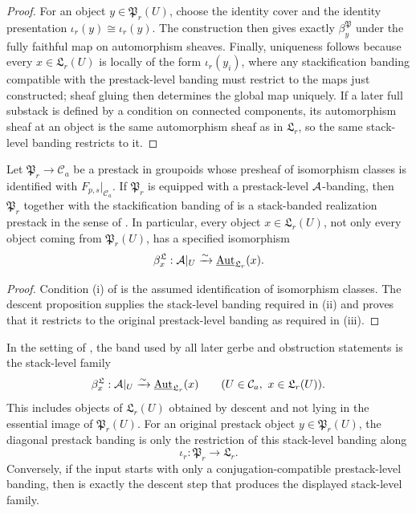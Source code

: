 \begin{proof}
For an object $y\in\mathfrak P_r(U)$, choose the identity cover and the
identity presentation $\iota_r(y)\cong\iota_r(y)$. The construction then gives
exactly $\beta^{\mathfrak P}_y$ under the fully faithful map on automorphism
sheaves. Finally, uniqueness follows because every $x\in\mathfrak L_r(U)$ is
locally of the form $\iota_r(y_i)$, where any stackification banding compatible
with the prestack-level banding must restrict to the maps just constructed; sheaf
gluing then determines the global map uniquely. If a later full substack is
defined by a condition on connected components, its automorphism sheaf at an
object is the same automorphism sheaf as in $\mathfrak L_r$, so the same
stack-level banding restricts to it.
\end{proof}

\begin{corollary}\label{cor:prestack-band-gives-stack-banded-input}
Let $\mathfrak P_r\to\mathcal C_a$ be a prestack in groupoids whose presheaf of
isomorphism classes is identified with $F_{p,s}|_{\mathcal C_a}$. If
$\mathfrak P_r$ is equipped with a prestack-level $\mathcal{A}$-banding, then
$\mathfrak P_r$ together with the stackification banding of
 is a stack-banded realization prestack
in the sense of . In particular, every object
$x\in\mathfrak L_r(U)$, not only every object coming from
$\mathfrak P_r(U)$, has a specified isomorphism
\[
\beta^{\mathfrak L}_x:\mathcal{A}|_U\xrightarrow{\sim}
\underline{\mathrm{Aut}}_{\mathfrak L_r}(x).
\]
\end{corollary}

\begin{proof}
Condition \textup{(i)} of  is the assumed
identification of isomorphism classes. The descent proposition supplies the
stack-level banding required in \textup{(ii)} and proves that it restricts to
the original prestack-level banding as required in \textup{(iii)}.
\end{proof}

\begin{proposition}\label{prop:band-lives-on-stackification}
In the setting of , the band used by all later
gerbe and obstruction statements is the stack-level family
\[
\beta^{\mathfrak L}_x:\mathcal{A}|_U\xrightarrow{\sim}
\underline{\mathrm{Aut}}_{\mathfrak L_r}(x)
\qquad (U\in\mathcal C_a,\ x\in\mathfrak L_r(U)).
\]
This includes objects of $\mathfrak L_r(U)$ obtained by descent and not lying in
the essential image of $\mathfrak P_r(U)$. For an original prestack object
$y\in\mathfrak P_r(U)$, the diagonal prestack banding is only the restriction
of this stack-level banding along
\[
\iota_r:\mathfrak P_r\to\mathfrak L_r.
\]
Conversely, if the input starts with only a conjugation-compatible
prestack-level banding, then  is exactly
the descent step that produces the displayed stack-level family.
\end{proposition}

